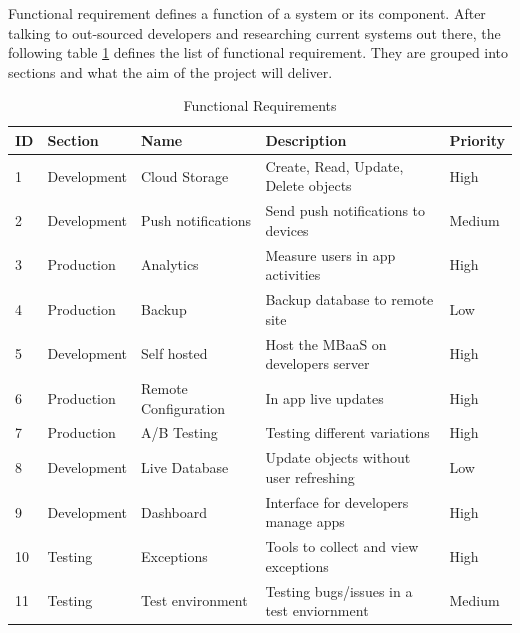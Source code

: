Functional requirement defines a function of a system or its component. After talking to out-sourced developers and researching current systems out there, the following table \ref{tb:functional} defines the list of functional requirement. They are grouped into sections and what the aim of the project will deliver.

\begin{table}[!h]
\centering
\caption{Functional Requirements}
\label{tb:functional}
\begin{tabular}{|l|l|l|l|l|}
\hline
\cellcolor{green!20}ID & \cellcolor{green!20}Section  & \cellcolor{green!20}Name  & \cellcolor{green!20}Description        & \cellcolor{green!20}Priority \\ \hline
1                      & Development                  & Cloud Storage            & Create, Read, Update, Delete objects   & High   \\ \hline
2                      & Development                  & Push notifications        & Send push notifications to devices     & Medium \\ \hline
3                      & Production                   & Analytics                 & Measure users in app activities        & High   \\ \hline
4                      & Production                   & Backup                    & Backup database to remote site         & Low    \\ \hline
5                      & Development                  & Self hosted               & Host the MBaaS on developers server    & High   \\ \hline
6                      & Production                   & Remote Configuration      & In app live updates                    & High   \\ \hline
7                      & Production                   & A/B Testing               & Testing different variations           & High   \\ \hline
8                      & Development                  & Live Database             & Update objects without user refreshing & Low    \\ \hline
9                      & Development                  & Dashboard                & Interface for developers manage apps   & High   \\ \hline
10                     & Testing                      & Exceptions                 & Tools to collect and view exceptions   & High   \\ \hline
11                     & Testing                      & Test environment      & Testing bugs/issues in a test enviornment & Medium \\ \hline
\end{tabular}
\end{table}

